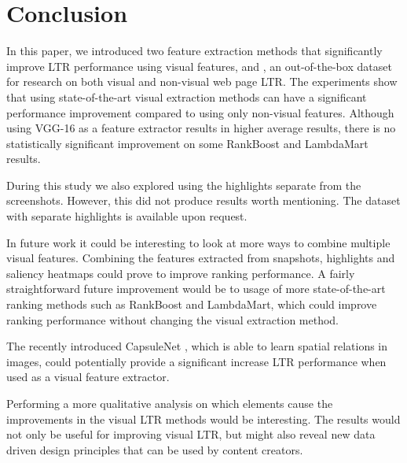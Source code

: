 
\section{Conclusion}


In this paper, we introduced two feature extraction methods that significantly improve \ac{LTR} performance using visual features, and \datasetname, an out-of-the-box dataset for research on both visual and non-visual web page \ac{LTR}.
The experiments show that using state-of-the-art visual extraction methods can have a significant performance improvement compared to using only non-visual features. Although using VGG-16 as a feature extractor results in higher average results, there is no statistically significant improvement on some RankBoost and LambdaMart results. 

During this study we also explored using the highlights separate from the screenshots. However, this did not produce results worth mentioning. The dataset with separate highlights is available upon request. 

In future work it could be interesting to look at more ways to combine multiple visual features. Combining the features extracted from snapshots, highlights and saliency heatmaps could prove to improve ranking performance. 
A fairly straightforward future improvement would be to usage of more state-of-the-art ranking methods such as RankBoost and LambdaMart, which could improve ranking performance without changing the visual extraction method.

The recently introduced CapsuleNet \cite{sabour2017dynamic}, which is able to learn spatial relations in images, could potentially provide a significant increase \ac{LTR} performance when used as a visual feature extractor.  

Performing a more qualitative analysis on which elements cause the improvements in the visual \ac{LTR} methods would be interesting. The results would not only be useful for improving visual \ac{LTR}, but might also reveal new data driven design principles that can be used by content creators. 